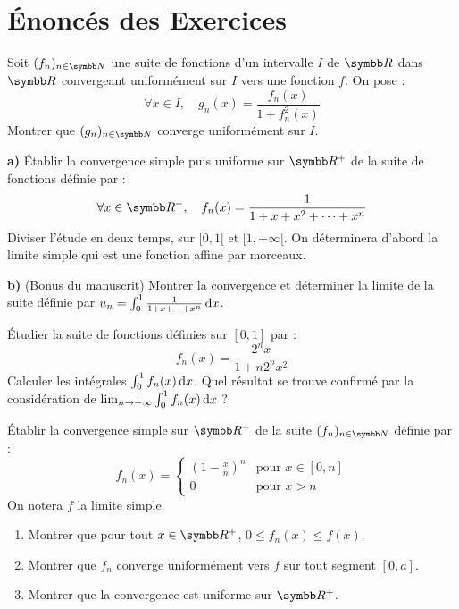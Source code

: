 

\section{Énoncés des Exercices}

\begin{exercice}
Soit $(f_n)_{n\in\N}$ une suite de fonctions d'un intervalle $I$ de $\R$ dans $\R$ convergeant uniformément sur $I$ vers une fonction $f$.
On pose :
$$ \forall x \in I, \quad g_n(x) = \frac{f_n(x)}{1+f_n^2(x)} $$
Montrer que $(g_n)_{n\in\N}$ converge uniformément sur $I$.
\end{exercice}

\begin{exercice}
\textbf{a)} Établir la convergence simple puis uniforme sur $\R^+$ de la suite de fonctions définie par :
$$ \forall x \in \R^+, \quad f_n(x) = \frac{1}{1+x+x^2+\dots+x^n} $$
Diviser l'étude en deux temps, sur $[0, 1[$ et $[1, +\infty[$. On déterminera d'abord la limite simple qui est une fonction affine par morceaux.

\textbf{b)} (Bonus du manuscrit) Montrer la convergence et déterminer la limite de la suite définie par $u_n = \int_0^1 \frac{1}{1+x+\dots+x^n} \,\mathrm{d}x$.
\end{exercice}

\begin{exercice}
Étudier la suite de fonctions définies sur $[0, 1]$ par :
$$ f_n(x) = \frac{2^n x}{1+n 2^n x^2} $$
Calculer les intégrales $\int_0^1 f_n(x) \,\mathrm{d}x$. Quel résultat se trouve confirmé par la considération de $\lim_{n\to+\infty} \int_0^1 f_n(x) \,\mathrm{d}x$ ?
\end{exercice}

\begin{exercice}
Établir la convergence simple sur $\R^+$ de la suite $(f_n)_{n\in\N}$ définie par :
$$ f_n(x) = \begin{cases} (1-\frac{x}{n})^n & \text{pour } x \in [0, n] \\ 0 & \text{pour } x > n \end{cases} $$
On notera $f$ la limite simple.
\begin{enumerate}
    \item Montrer que pour tout $x \in \R^+$, $0 \le f_n(x) \le f(x)$.
    \item Montrer que $f_n$ converge uniformément vers $f$ sur tout segment $[0, a]$.
    \item Montrer que la convergence est uniforme sur $\R^+$.
\end{enumerate}
\end{exercice}

